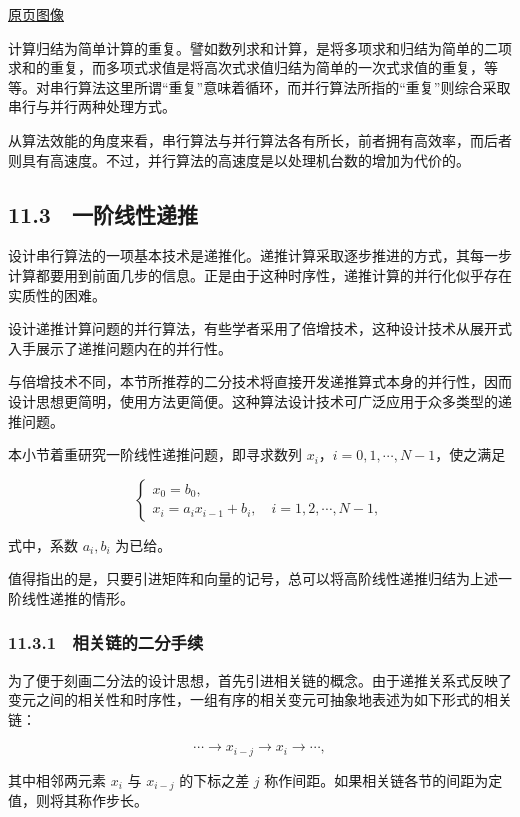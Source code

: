 \href{source-images/pdf-285.jpeg}{原页图像}

计算归结为简单计算的重复。譬如数列求和计算，是将多项求和归结为简单的二项求和的重复，而多项式求值是将高次式求值归结为简单的一次式求值的重复，等等。对串行算法这里所谓``重复''意味着循环，而并行算法所指的``重复''则综合采取串行与并行两种处理方式。

从算法效能的角度来看，串行算法与并行算法各有所长，前者拥有高效率，而后者则具有高速度。不过，并行算法的高速度是以处理机台数的增加为代价的。

\subsection{11.3　一阶线性递推}\label{ch11-ux4e00ux9636ux7ebfux6027ux9012ux63a8}

设计串行算法的一项基本技术是递推化。递推计算采取逐步推进的方式，其每一步计算都要用到前面几步的信息。正是由于这种时序性，递推计算的并行化似乎存在实质性的困难。

设计递推计算问题的并行算法，有些学者采用了倍增技术，这种设计技术从展开式入手展示了递推问题内在的并行性。

与倍增技术不同，本节所推荐的二分技术将直接开发递推算式本身的并行性，因而设计思想更简明，使用方法更简便。这种算法设计技术可广泛应用于众多类型的递推问题。

本小节着重研究一阶线性递推问题，即寻求数列 \(x_i\)，\(i=0,1,\cdots,N-1\)，使之满足

\[
\begin{cases}
x_0=b_0,\\
x_i=a_i x_{i-1}+b_i,\quad i=1,2,\cdots,N-1,
\end{cases}
\tag{11.3.1}
\]

式中，系数 \(a_i,b_i\) 为已给。

值得指出的是，只要引进矩阵和向量的记号，总可以将高阶线性递推归结为上述一阶线性递推的情形。

\subsubsection{11.3.1　相关链的二分手续}\label{ch11-ux76f8ux5173ux94feux7684ux4e8cux5206ux624bux7eed}

为了便于刻画二分法的设计思想，首先引进相关链的概念。由于递推关系式反映了变元之间的相关性和时序性，一组有序的相关变元可抽象地表述为如下形式的相关链：

\[
\cdots\to x_{i-j}\to x_i\to\cdots,
\]

其中相邻两元素 \(x_i\) 与 \(x_{i-j}\) 的下标之差 \(j\) 称作间距。如果相关链各节的间距为定值，则将其称作步长。

